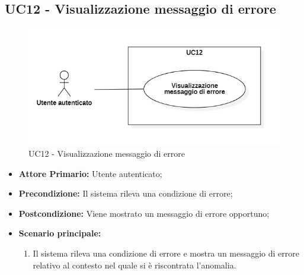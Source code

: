 \subsection{UC12 - Visualizzazione messaggio di errore}
\begin{figure}[H]
    \centering
    \includegraphics[scale = 0.7]{components/img/UC12.png}
    \caption{UC12 - Visualizzazione messaggio di errore}
\end{figure}
\begin{itemize}
\item \textbf{Attore Primario:} Utente autenticato;
\item \textbf{Precondizione:} Il sistema rileva una condizione di errore;
\item \textbf{Postcondizione:} Viene mostrato un messaggio di errore opportuno;
\item \textbf{Scenario principale:}
    \begin{enumerate}
    \item Il sistema rileva una condizione di errore e mostra un messaggio di errore relativo al contesto nel quale si è riscontrata l'anomalia.
    \end{enumerate}
\end{itemize}